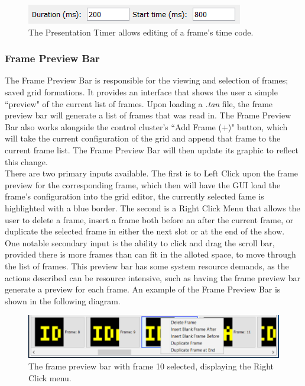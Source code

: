 \documentclass[12pt]{article}
\begin{document}
   \begin{figure}[h]
     \centering
     \includegraphics[width=.6\linewidth]{presentation_timer.png}
     \caption{
       The Presentation Timer allows editing of a frame's time code.
     }
   \end{figure}
  \subsubsection {Frame Preview Bar}
   The Frame Preview Bar is responsible for the viewing and selection of frames; saved grid formations. It provides an interface that shows the user a simple ``preview" of the current list of frames. Upon loading a \textit{.tan} file, the frame preview bar will generate a list of frames that was read in. The Frame Preview Bar also works alongside the control cluster's  ``Add Frame (+)" button, which will take the current configuration of the grid and append that frame to the current frame list. The Frame Preview Bar will then update its graphic to reflect this change.
   \\
   There are two primary inputs available. The first is to Left Click upon the frame preview for the corresponding frame, which then will have the GUI load the frame's configuration into the grid editor, the currently selected fame is highlighted with a blue border. The second is a Right Click Menu that allows the user to delete a frame, insert a frame both before an after the current frame, or duplicate the selected frame in either the next slot or at the end of the show.
   \\
   One notable secondary input is the ability to click and drag the scroll bar, provided there is more frames than can fit in the alloted space, to move through the list of frames. This preview bar has some system resource demands, as the actions described can be resource intensive, such as having the frame preview bar generate a preview for each frame. An example of the Frame Preview Bar is shown in the following diagram.
  
  \begin{figure}[ht!]
    \centering
    \includegraphics[width=\linewidth]{frame_preview.png}
    \caption{The frame preview bar with frame 10 selected, displaying the Right Click menu.}
  \end{figure}
\end{document}
